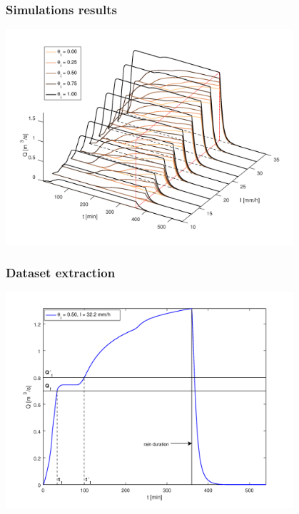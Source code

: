 \documentclass[xcolor=dvipsnames, USenglish]{beamer}  %
\begin{document}
  \begin{frame}
    \frametitle{Simulations results}
    \centering    
    \includegraphics[width=0.8\textwidth]{img/hydrographs3d.png}
  \end{frame}


  \begin{frame}
    \frametitle{Dataset extraction}
    \centering
    \includegraphics[width=0.8\textwidth]{img/hydrograph.png}
  \end{frame}
\end{document}
